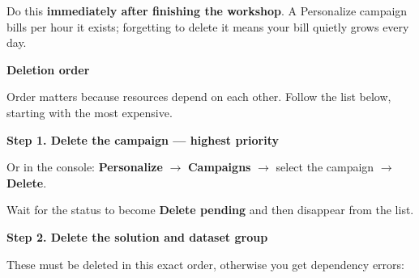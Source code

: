 Do this \textbf{immediately after finishing the workshop}. A Personalize
campaign bills per hour it exists; forgetting to delete it means your
bill quietly grows every day.

\vspace{0.5em}\noindent\textbf{Deletion order}\par

Order matters because resources depend on each other. Follow the list
below, starting with the most expensive.

\vspace{0.5em}\noindent\textbf{Step 1. Delete the campaign --- highest
priority}\par

\begin{Shaded}
\begin{Highlighting}[]
 \OperatorTok{\textless{}}\OperatorTok{\textgreater{}}
\end{Highlighting}
\end{Shaded}

Or in the console: \textbf{Personalize} \(\rightarrow\)
\textbf{Campaigns} \(\rightarrow\) select the campaign \(\rightarrow\)
\textbf{Delete}.

Wait for the status to become \textbf{Delete pending} and then disappear
from the list.

\vspace{0.5em}\noindent\textbf{Step 2. Delete the solution and dataset
group}\par

These must be deleted in this exact order, otherwise you get dependency
errors:

\begin{Shaded}
\begin{Highlighting}[]
 \OperatorTok{\textless{}}\OperatorTok{\textgreater{}}

 \OperatorTok{\textless{}}\OperatorTok{\textgreater{}}

 \OperatorTok{\textless{}}\OperatorTok{\textgreater{}}
\end{Highlighting}
\end{Shaded}

